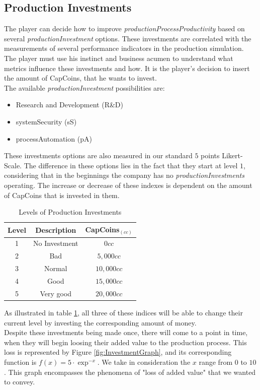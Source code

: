 \subsection{Production Investments}
The player can decide how to improve \textit{productionProcessProductivity} based on several \textit{productionInvestment} options. These investments are correlated with the measurements of several performance indicators in the production simulation. The player must use his instinct and business acumen to understand what metrics influence these investments and how. It is the player's decision to insert the amount of CapCoins, that he wants to invest. \\
The available \textit{productionInvestment} possibilities are:
\begin{itemize}
\item Research and Development (R\&D)
\item systemSecurity (\gls{sS})
\item processAutomation (pA)
\end{itemize}
These investments options are also measured in our standard $5$ points Likert-Scale. The difference in these options lies in the fact that they start at level $1$, considering that in the beginnings the company has no \textit{productionInvestments} operating. The increase or decrease of these indexes is dependent on the amount of CapCoins that is invested in them.
\begin{table}[ht]
\centering
\begin{tabular}{c|c|c}
\hline
 Level & Description & CapCoins$_{(cc)}$\\
\hline \hline

 1 & No Investment & $0cc$ \\
 2 & Bad & $ 5,000cc$\\
 3 & Normal & $10,000cc$ \\
 4 & Good & $15,000cc$ \\
 5 & Very good & $20,000cc$\\
\hline
\end{tabular}
\caption{Levels of Production Investments}
\label{table:prod-investments}
\end{table}
As illustrated in table \ref{table:prod-investments}, all three of these indices will be able to change their current level by investing the corresponding amount of money.\\
Despite these investments being made once, there will come to a point in time, when they will begin loosing their added value to the production process. This loss is represented by Figure \ref{fig:InvestmentGraph}, and its corresponding function is $f(x)=5\cdot\exp^{-x}$. We take in consideration the $x$ range from $0$ to $10$. This graph encompasses the phenomena of "loss of added value" that we wanted to convey.

